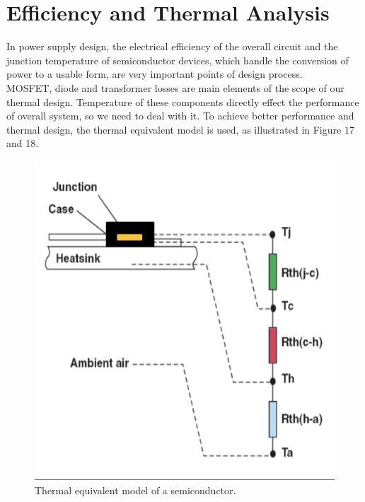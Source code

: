 \documentclass{article}
\begin{document}
\section{Efficiency and Thermal Analysis}
In power supply design, the electrical efficiency of the overall circuit and the junction temperature of semiconductor devices, which handle the conversion of power to a usable form, are very important points of design process.\\
MOSFET, diode and transformer losses are main elements of the scope of our thermal design.
Temperature of these components directly effect the performance of overall system, so we need to deal with it. To achieve better performance and thermal design, the thermal equivalent model is used, as illustrated in Figure 17 and 18.
\begin{figure}[H]
    \centering
    \includegraphics[scale=0.5]{thermal.png}
    \caption{Thermal equivalent model of a semiconductor.}
    \label{fig:my_label}
\end{figure}
\end{document}
